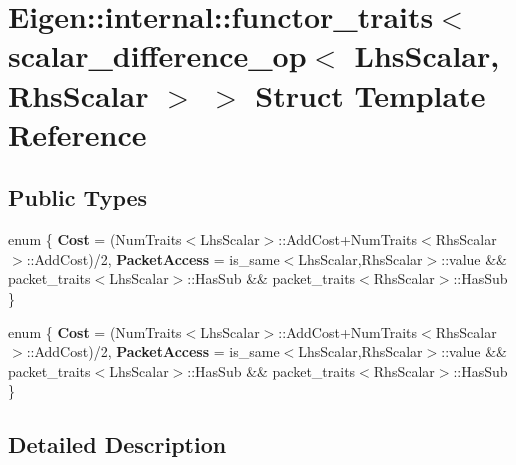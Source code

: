 \hypertarget{struct_eigen_1_1internal_1_1functor__traits_3_01scalar__difference__op_3_01_lhs_scalar_00_01_rhs_scalar_01_4_01_4}{}\section{Eigen\+:\+:internal\+:\+:functor\+\_\+traits$<$ scalar\+\_\+difference\+\_\+op$<$ Lhs\+Scalar, Rhs\+Scalar $>$ $>$ Struct Template Reference}
\label{struct_eigen_1_1internal_1_1functor__traits_3_01scalar__difference__op_3_01_lhs_scalar_00_01_rhs_scalar_01_4_01_4}
\subsection*{Public Types}
\begin{DoxyCompactItemize}
\item 
\mbox{\label{struct_eigen_1_1internal_1_1functor__traits_3_01scalar__difference__op_3_01_lhs_scalar_00_01_rhs_scalar_01_4_01_4_acacc447665c9b8da3a13f9d2369e22d9}} 
enum \{ {\bfseries Cost} = (Num\+Traits$<$Lhs\+Scalar$>$\+:\+:Add\+Cost+\+Num\+Traits$<$Rhs\+Scalar$>$\+:\+:Add\+Cost)/2, 
{\bfseries Packet\+Access} = is\+\_\+same$<$Lhs\+Scalar,Rhs\+Scalar$>$\+:\+:value \&\& packet\+\_\+traits$<$Lhs\+Scalar$>$\+:\+:Has\+Sub \&\& packet\+\_\+traits$<$Rhs\+Scalar$>$\+:\+:Has\+Sub
 \}
\item 
\mbox{\label{struct_eigen_1_1internal_1_1functor__traits_3_01scalar__difference__op_3_01_lhs_scalar_00_01_rhs_scalar_01_4_01_4_a26e397155372232d3b93fa07a03827fa}} 
enum \{ {\bfseries Cost} = (Num\+Traits$<$Lhs\+Scalar$>$\+:\+:Add\+Cost+\+Num\+Traits$<$Rhs\+Scalar$>$\+:\+:Add\+Cost)/2, 
{\bfseries Packet\+Access} = is\+\_\+same$<$Lhs\+Scalar,Rhs\+Scalar$>$\+:\+:value \&\& packet\+\_\+traits$<$Lhs\+Scalar$>$\+:\+:Has\+Sub \&\& packet\+\_\+traits$<$Rhs\+Scalar$>$\+:\+:Has\+Sub
 \}
\end{DoxyCompactItemize}


\subsection{Detailed Description}
